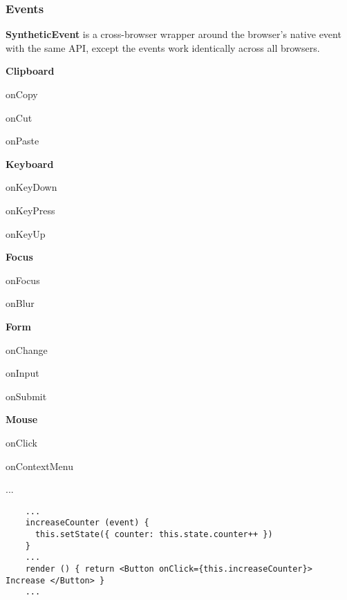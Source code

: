 \begin{frame}[fragile]

  \frametitle{Events}

  \textbf{SyntheticEvent} is a cross-browser wrapper around the browser's native event with the same API, except the events work identically across all browsers.

  \begin{footnotesize}
  \begin{multicols}{5}

    \textbf{Clipboard}

    onCopy

    onCut

    onPaste

    \columnbreak

    \textbf{Keyboard}

    onKeyDown

    onKeyPress

    onKeyUp

    \columnbreak

    \textbf{Focus}

    onFocus

    onBlur

    \columnbreak

    \textbf{Form}

    onChange

    onInput

    onSubmit

    \columnbreak

    \textbf{Mouse}

    onClick

    onContextMenu

    ...

  \end{multicols}
  \end{footnotesize}
  \begin{verbatim}
    ...
    increaseCounter (event) {
      this.setState({ counter: this.state.counter++ })
    }
    ...
    render () { return <Button onClick={this.increaseCounter}> Increase </Button> }
    ...
  \end{verbatim}
\end{frame}

